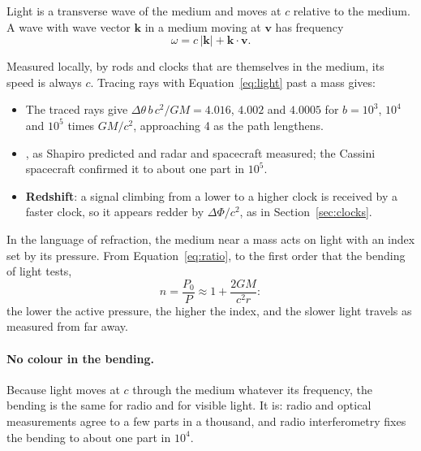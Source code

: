 \documentclass[11pt,a4paper]{article}
\begin{document}
\begin{hypbar}
Light is a transverse wave of the medium and moves at $c$ relative to the medium. A wave with wave vector $\mathbf{k}$ in a medium moving at $\mathbf{v}$ has frequency
\begin{equation}
\omega = c\,|\mathbf{k}| + \mathbf{k}\cdot\mathbf{v}.
\label{eq:light}
\end{equation}
\end{hypbar}

Measured locally, by rods and clocks that are themselves in the medium, its speed is always $c$. Tracing rays with Equation~\eqref{eq:light} past a mass gives:
\begin{itemize}
\item {} The traced rays give $\Delta\theta\, b\,c^2/GM = 4.016$, $4.002$ and $4.0005$ for $b = 10^3$, $10^4$ and $10^5$ times $GM/c^2$, approaching 4 as the path lengthens.
\item {}, as Shapiro predicted and radar and spacecraft measured; the Cassini spacecraft confirmed it to about one part in $10^5$.
\item \textbf{Redshift}: a signal climbing from a lower to a higher clock is received by a faster clock, so it appears redder by $\Delta\Phi/c^2$, as in Section~\ref{sec:clocks}.
\end{itemize}
In the language of refraction, the medium near a mass acts on light with an index set by its pressure. From Equation~\eqref{eq:ratio}, to the first order that the bending of light tests,
\begin{equation}
n = \frac{P_0}{P} \approx 1 + \frac{2GM}{c^2 r}:
\end{equation}
the lower the active pressure, the higher the index, and the slower light travels as measured from far away.

\paragraph{No colour in the bending.} Because light moves at $c$ through the medium whatever its frequency, the bending is the same for radio and for visible light. It is: radio and optical measurements agree to a few parts in a thousand, and radio interferometry fixes the bending to about one part in $10^4$.
\end{document}

